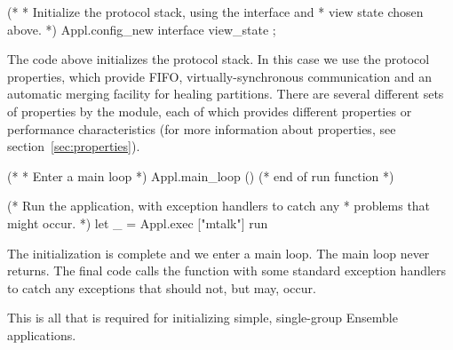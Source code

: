 \begin{codebox}    
  (*
   * Initialize the protocol stack, using the interface and
   * view state chosen above.  
   *)
  Appl.config_new interface view_state ;
\end{codebox}    
The code above initializes the protocol stack.  In this case we use
the  protocol properties, which provide FIFO,
virtually-synchronous communication and an automatic merging facility
for healing partitions.  There are several different sets of
properties by the  module, each of which
provides different properties or performance characteristics (for
more information about properties, see section~\ref{sec:properties}).

\begin{codebox}    
  (*
   * Enter a main loop
   *)
  Appl.main_loop ()
  (* end of run function *)


(* Run the application, with exception handlers to catch any
 * problems that might occur.
 *)
let _ = Appl.exec ["mtalk"] run
\end{codebox}    
The initialization is complete and we enter a main loop.  The main
loop never returns.  The final code calls the  function
with some standard exception handlers to catch any exceptions that
should not, but may, occur.

This is all that is required for initializing simple, single-group Ensemble
applications.  
